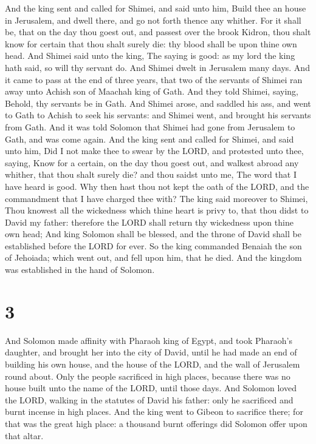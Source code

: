  And the king sent and called for Shimei, and said unto
him, Build thee an house in Jerusalem, and dwell there, and go not forth
thence any whither.  For it shall be, that on the day thou
goest out, and passest over the brook Kidron, thou shalt know for
certain that thou shalt surely die: thy blood shall be upon thine own
head.  And Shimei said unto the king, The saying is good:
as my lord the king hath said, so will thy servant do. And Shimei dwelt
in Jerusalem many days.  And it came to pass at the end of
three years, that two of the servants of Shimei ran away unto Achish son
of Maachah king of Gath. And they told Shimei, saying, Behold, thy
servants be in Gath.  And Shimei arose, and saddled his
ass, and went to Gath to Achish to seek his servants: and Shimei went,
and brought his servants from Gath.  And it was told
Solomon that Shimei had gone from Jerusalem to Gath, and was come again.
 And the king sent and called for Shimei, and said unto
him, Did I not make thee to swear by the LORD, and protested unto thee,
saying, Know for a certain, on the day thou goest out, and walkest
abroad any whither, that thou shalt surely die? and thou saidst unto me,
The word that I have heard is good.  Why then hast thou not
kept the oath of the LORD, and the commandment that I have charged thee
with?  The king said moreover to Shimei, Thou knowest all
the wickedness which thine heart is privy to, that thou didst to David
my father: therefore the LORD shall return thy wickedness upon thine own
head;  And king Solomon shall be blessed, and the throne of
David shall be established before the LORD for ever.  So
the king commanded Benaiah the son of Jehoiada; which went out, and fell
upon him, that he died. And the kingdom was established in the hand of
Solomon.

\hypertarget{section-2}{%
\section{3}\label{section-2}}

 And Solomon made affinity with Pharaoh king of Egypt, and
took Pharaoh's daughter, and brought her into the city of David, until
he had made an end of building his own house, and the house of the LORD,
and the wall of Jerusalem round about.  Only the people
sacrificed in high places, because there was no house built unto the
name of the LORD, until those days.  And Solomon loved the
LORD, walking in the statutes of David his father: only he sacrificed
and burnt incense in high places.  And the king went to
Gibeon to sacrifice there; for that was the great high place: a thousand
burnt offerings did Solomon offer upon that altar.


